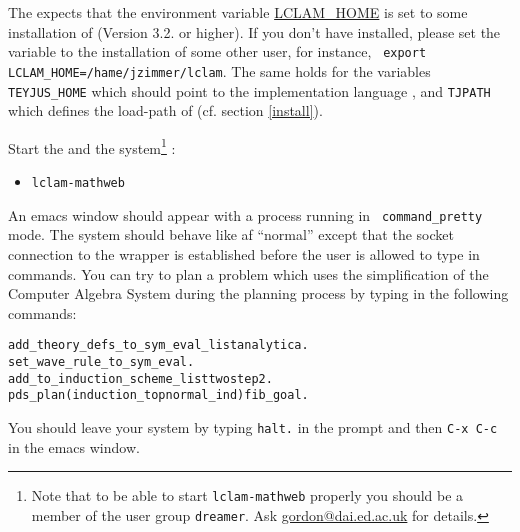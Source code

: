The {\mathwebsb} expects that the environment variable
\url{LCLAM_HOME} is set to some installation of {\lclam} (Version 3.2.
or higher). If you don't have {\lclam} installed, please set the
variable to the installation of some other user, for instance, {\tt
  export LCLAM\_HOME=/hame/jzimmer/lclam}.  The same holds for the
variables {\tt TEYJUS\_HOME} which should point to the implementation
language {\teyjus}, and {\tt TJPATH} which defines the load-path of
{\teyjus} (cf.  section \ref{install}).


\noindent Start the {\mathwebsb} and the {\lclam} system\footnote{Note that to be able to start
  {\tt lclam-mathweb} properly you should be a member of the user
  group {\tt dreamer}. Ask \url{gordon@dai.ed.ac.uk} for details.}  :
\begin{itemize}
\item {\tt lclam-mathweb}
\end{itemize}
An emacs window should appear with a {\lclam} process running in {\tt
  command\_pretty} mode. The system should behave like af ``normal''
{\lclam} except that the socket connection to the {\mathwebsb} wrapper
is established before the user is allowed to type in commands.  You
can try to plan a problem which uses the simplification of the
Computer Algebra System {\maple} during the planning process by typing
in the following commands:
\begin{alltt}
   add_theory_defs_to_sym_eval_list analytica.
   set_wave_rule_to_sym_eval.
   add_to_induction_scheme_list twostep2.
   pds_plan (induction_top normal_ind) fib_goal.
\end{alltt}
You should leave your {\lclam} system by typing {\tt halt.} in the
{\lclam} prompt and then {\tt C-x C-c} in the emacs window.




